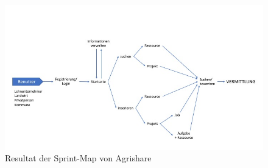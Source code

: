 %
%
\begin{figure}[h!]
	\includegraphics[width=\textwidth]{99_IMG/03_Sprint/map}
	\caption{Resultat der Sprint-Map von Agrishare}
	\label{fig:map}
\end{figure}
%

